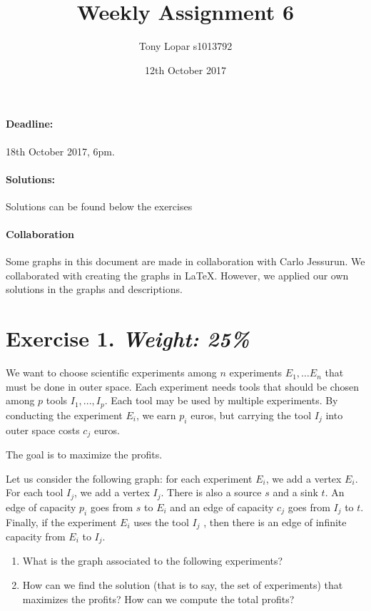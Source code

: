 \documentclass{article}
\begin{document}
\title{Weekly Assignment 6}
\date{12th October 2017}
\author{Tony Lopar s1013792}
\maketitle

\paragraph{Deadline:} 18th October 2017, 6pm.
\paragraph{Solutions:} Solutions can be found below the exercises
\paragraph{Collaboration} Some graphs in this document are made in collaboration with Carlo Jessurun. We collaborated with creating the graphs in LaTeX. However, we applied our own solutions in the graphs and descriptions.

\section*{Exercise 1. \textit{Weight: 25\%}}
We want to choose scientific experiments among $n$ experiments $E_1, \ldots E_n$ that must be done in outer space. Each experiment needs tools that should be chosen among $p$ tools $I_1, . . . , I_p$. Each tool may be used by multiple experiments. By conducting the experiment $E_i$, we earn $p_i$ euros, but carrying the tool $I_j$ into outer space costs $c_j$ euros.

The goal is to maximize the profits.

Let us consider the following graph: for each experiment $E_i$, we add a vertex $E_i$. For each tool $I_j$, we add a vertex $I_j$. There is also a source $s$ and a sink $t$. An edge of capacity $p_i$ goes from $s$ to $E_i$ and an edge of capacity $c_j$ goes from $I_j$ to $t$. Finally, if the experiment $E_i$ uses the tool $I_j$ , then there is an edge of infinite capacity from $E_i$ to $I_j$.

\begin{enumerate}
  \item What is the graph associated to the following experiments?


  \item How can we find the solution (that is to say, the set of experiments) that maximizes the profits? How can we compute the total profits?
\end{enumerate}
\end{document}
